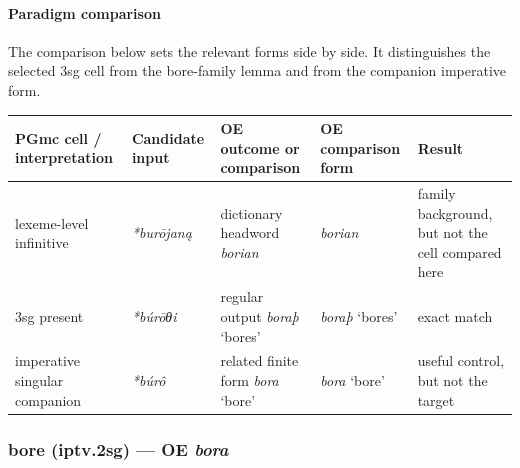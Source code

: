 \documentclass[
  british,
  a4paper,
]{article}
\newcounter{none} %
\begin{document}
\paragraph{Paradigm comparison}\label{paradigm-comparison-3}

The comparison below sets the relevant forms side by side. It
distinguishes the selected 3sg cell from the bore-family lemma and from
the companion imperative form.

{\def\LTcaptype{none} %
\begin{longtable}[]{@{}
  >{\raggedright\arraybackslash}p{}
  >{\raggedright\arraybackslash}p{}
  >{\raggedright\arraybackslash}p{}
  >{\raggedright\arraybackslash}p{}
  >{\raggedright\arraybackslash}p{}@{}}
\toprule\noalign{}
\begin{minipage}[b]{\linewidth}\raggedright
PGmc cell / interpretation
\end{minipage} & \begin{minipage}[b]{\linewidth}\raggedright
Candidate input
\end{minipage} & \begin{minipage}[b]{\linewidth}\raggedright
OE outcome or comparison
\end{minipage} & \begin{minipage}[b]{\linewidth}\raggedright
OE comparison form
\end{minipage} & \begin{minipage}[b]{\linewidth}\raggedright
Result
\end{minipage} \\
\midrule\noalign{}
\endhead
\bottomrule\noalign{}
\endlastfoot
lexeme-level infinitive & {\emph{*burōjaną}} & dictionary headword
{\emph{borian}} & {\emph{borian}} & family background, but not the cell
compared here \\
3sg present & {\emph{*búrōθi}} & regular output {\emph{boraþ}} `bores' &
{\emph{boraþ}} `bores' & exact match \\
imperative singular companion & {\emph{*búrô}} & related finite form
{\emph{bora}} `bore' & {\emph{bora}} `bore' & useful control, but not
the target \\
\end{longtable}
}

\subsubsection{\texorpdfstring{bore (iptv.2sg) --- OE
\emph{bora}}{bore (iptv.2sg) --- OE bora}}\label{bore-iptv.2sg-oe-bora}
\end{document}
